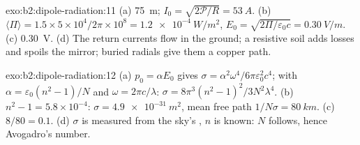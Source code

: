 \begin{solution}{exo:b2:dipole-radiation:11}
(a) \qty{75}{m}; $I_0 = \sqrt{2\mathcal P/R} = \qty{53}{A}$. (b) $\langle\Pi\rangle = 1.5 \times
5 \times 10^4/2\pi \times 10^8 = \qty{1.2e-4}{W/m^2}$, $E_0 = \sqrt{2\Pi/\varepsilon_0c} = \qty{0.30}{V/m}$.
(c) \qty{0.30}{V}. (d) The return currents flow in the ground; a resistive
soil adds losses and spoils the mirror; buried radials give them a
copper path.
\end{solution}

\begin{solution}{exo:b2:dipole-radiation:12}
(a) $p_0 = \alpha E_0$ gives $\sigma = \alpha^2\omega^4/6\pi\varepsilon_0^2c^4$; with $\alpha = \varepsilon_0(n^2
- 1)/N$ and $\omega = 2\pi c/\lambda$: $\sigma = 8\pi^3(n^2 - 1)^2/3N^2\lambda^4$. (b) $n^2 - 1 =
5.8 \times 10^{-4}$: $\sigma = \qty{4.9e-31}{m^2}$, mean free path $1/N\sigma = \qty{80}{km}$. (c)
$8/80 = 0.1$. (d) $\sigma$ is measured from the sky's , $n$ is
known: $N$ follows, hence Avogadro's number.
\end{solution}

